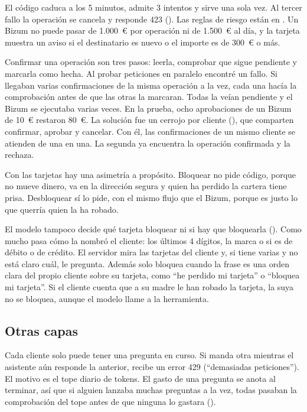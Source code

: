 El código caduca a los 5 minutos, admite 3 intentos y sirve una sola vez. Al tercer fallo la operación se cancela y
responde 423 (). Las reglas de riesgo están en . Un Bizum no puede
pasar de 1.000~€ por operación ni de 1.500~€ al día, y la tarjeta muestra un aviso si el destinatario es nuevo o el
importe es de 300~€ o más.

Confirmar una operación son tres pasos: leerla, comprobar que sigue pendiente y marcarla como hecha. Al probar
peticiones en paralelo encontré un fallo. Si llegaban varias confirmaciones de la misma operación a la vez, cada una
hacía la comprobación antes de que las otras la marcaran. Todas la veían pendiente y el Bizum se ejecutaba varias
veces. En la prueba, ocho aprobaciones de un Bizum de 10~€ restaron 80~€. La solución fue un cerrojo por cliente
(), que comparten confirmar, aprobar y cancelar. Con él, las confirmaciones de un mismo
cliente se atienden de una en una. La segunda ya encuentra la operación confirmada y la rechaza.

Con las tarjetas hay una asimetría a propósito. Bloquear no pide código, porque no mueve dinero, va en la dirección
segura y quien ha perdido la cartera tiene prisa. Desbloquear sí lo pide, con el mismo flujo que el Bizum, porque es
justo lo que querría quien la ha robado.

El modelo tampoco decide qué tarjeta bloquear ni si hay que bloquearla (). Como mucho
pasa cómo la nombró el cliente: los últimos 4 dígitos, la marca o si es de débito o de crédito. El servidor mira las
tarjetas del cliente y, si tiene varias y no está claro cuál, le pregunta. Además solo bloquea cuando la frase es una
orden clara del propio cliente sobre su tarjeta, como ``he perdido mi tarjeta'' o ``bloquea mi tarjeta''. Si el
cliente cuenta que a su madre le han robado la tarjeta, la suya no se bloquea, aunque el modelo llame a la
herramienta.

\subsection{Otras capas}\label{sec:otras-capas}

Cada cliente solo puede tener una pregunta en curso. Si manda otra mientras el asistente aún responde la anterior,
recibe un error 429 (``demasiadas peticiones''). El motivo es el tope diario de tokens. El gasto de una pregunta se
anota al terminar, así que si alguien lanzaba muchas preguntas a la vez, todas pasaban la comprobación del tope antes
de que ninguna lo gastara ().

